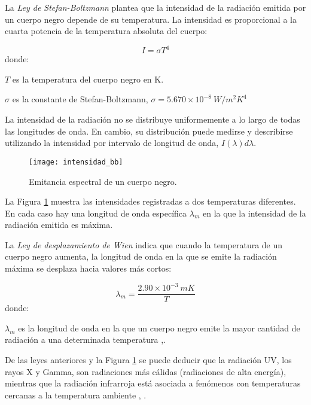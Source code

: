     La \textit{Ley de Stefan-Boltzmann} plantea que la intensidad de la radiación emitida por un cuerpo negro depende de su temperatura. La intensidad es proporcional a la cuarta potencia de la temperatura absoluta del cuerpo:
    
    \begin{equation}
        I = \sigma T^{4}
        \label{eq:Stefan-Boltzmann}
    \end{equation}
    donde:
    
    $T$ es la temperatura del cuerpo negro en K.
    
    $\sigma$ es la constante de Stefan-Boltzmann, $\sigma = 5.670\times10^{-8}\ W/m^{2}K^{4}$
    
    La intensidad de la radiación no se distribuye uniformemente a lo largo de todas las longitudes de onda. En cambio, su distribución puede medirse y describirse utilizando la intensidad por intervalo de longitud de onda, $I(\lambda)d\lambda$.
            \begin{figure}[hbtp]
                \centering
                \texttt{[image: intensidad\_bb]}
                \caption{Emitancia espectral de un cuerpo negro.}
                \label{fig:intensidad_bb}
            \end{figure}    
    La Figura \ref{fig:intensidad_bb} muestra las intensidades registradas a dos temperaturas diferentes. En cada caso hay una longitud de onda específica $\lambda_{m}$ en la que la intensidad de la radiación emitida es máxima.
    
    La \textit{Ley de desplazamiento de Wien} indica que cuando la temperatura de un cuerpo negro aumenta, la longitud de onda en la que se emite la radiación máxima se desplaza hacia valores más cortos:
    
    \begin{equation}
        \lambda_{m} = \frac{2.90\times10^{-3}\ mK}{T}
        \label{eq:Wien}
    \end{equation}   
    donde:
    
    $\lambda_{m}$ es la longitud de onda en la que un cuerpo negro emite la mayor cantidad de radiación a una determinada temperatura \cite{Sears},\cite{FUV3}.
    
    De las leyes anteriores y la Figura \ref{fig:intensidad_bb} se puede deducir que la radiación UV, los rayos X y Gamma, son radiaciones más cálidas (radiaciones de alta energía), mientras que la radiación infrarroja está asociada a fenómenos con temperaturas cercanas a la temperatura ambiente \cite{Chang}, \cite{BlancoMDA}.     
    
